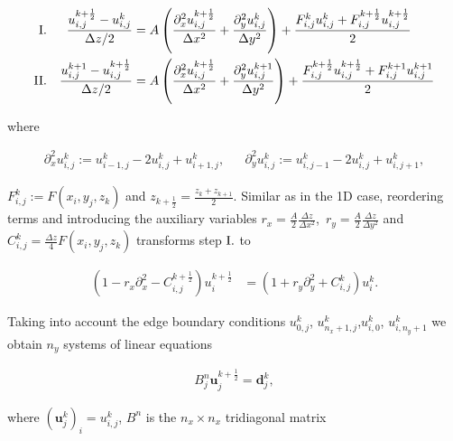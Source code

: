 \begin{align*}
\RN{1}. && \frac{u_{i,j}^{k+\frac{1}{2}} - u_{i,j}^{k}}{\Delta z/2} &=
A \left( \frac{\partial_x^2 u_{i,j}^{k+\frac{1}{2}}}{\Delta x^2}  + \frac{\partial_y^2 u_{i,j}^{k}}{\Delta y^2}  \right) + \frac{F_{i,j}^k u_{i,j}^{k} + F_{i,j}^{k+\frac{1}{2}} u_{i,j}^{k+\frac{1}{2}} }{2} \\
\RN{2}. && \frac{u_{i,j}^{k+1} - u_{i,j}^{k+\frac{1}{2}}}{\Delta z/2} &=
A \left(\frac{\partial_x^2 u_{i,j}^{k+\frac{1}{2}}}{\Delta x^2}  + \frac{\partial_y^2 u_{i,j}^{k+1}}{\Delta y^2}  \right) + \frac{F_{i,j}^{k+\frac{1}{2}} u_{i,j}^{k+\frac{1}{2}} + F_{i,j}^{k+1} u_{i,j}^{k+1} }{2} 
\end{align*}

{\centering 

where

}

\vspace{-1\baselineskip}

\begin{align*}
\partial_x^2 u_{i,j}^{k} := u_{i-1,j}^{k} - 2 u_{i,j}^{k} + u_{i+1,j}^{k}, && 
\partial_y^2 u_{i,j}^{k} := u_{i,j-1}^{k} - 2 u_{i,j}^{k} + u_{i,j+1}^{k},
\end{align*}

$F_{i,j}^{k} := F(x_i,y_j,z_k)$ and $z_{k+\frac{1}{2}} = \frac{z_{k} + z_{k+1}}{2}$. Similar as in the 1D case, reordering terms and introducing the auxiliary variables $r_x = \frac{A}{2} \frac{\Delta z}{ \Delta x^2}$, $\, r_y = \frac{A}{2} \frac{\Delta z}{ \Delta y^2}$ and $C_{i,j}^{k} = \frac{\Delta z}{4} F(x_i,y_j,z_{k})$ transforms step $\RN{1}.$ to

\begin{align} \label{eq:3D_finite_difference_equation}
( 1 - r_x \partial_x^2 - C_{i,j}^{k+\frac{1}{2}} ) u_{i}^{k+\frac{1}{2}} 
& = ( 1 + r_y \partial_y^2 + C_{i,j}^{k} ) u_{i}^{k}.
\end{align}

Taking into account the edge boundary conditions $u_{0,j}^k$, $u_{n_x+1,j}^{k}$,$u_{i,0}^k$, $u_{i,n_y+1}^{k}$ we obtain $n_y$ systems of linear equations

\begin{align} \label{eq:FD2DMatrixEquation}
B^n_j \boldsymbol u^{k+\frac{1}{2}}_j = \boldsymbol d^k_j,
\end{align}

where $\left(\boldsymbol u^{k}_j\right)_i = u_{i,j}^{k}$, $B^n$ is the $n_x \times n_x$ tridiagonal matrix

